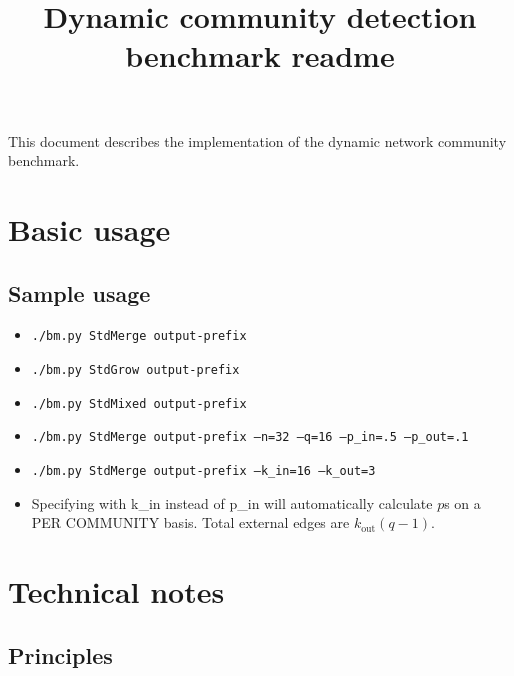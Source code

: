 \documentclass{article}
\title{Dynamic community detection benchmark readme}
\def\out{\mathrm{out}}
\begin{document}
\maketitle

This document describes the implementation of the dynamic network
community benchmark.


\section{Basic usage}

\subsection{Sample usage}

\begin{itemize}
\item \texttt{./bm.py StdMerge output-prefix}
\item \texttt{./bm.py StdGrow output-prefix}
\item \texttt{./bm.py StdMixed output-prefix}
\item \texttt{./bm.py StdMerge output-prefix --n=32 --q=16 --p\_in=.5 --p\_out=.1}
\item \texttt{./bm.py StdMerge output-prefix --k\_in=16 --k\_out=3}
\item Specifying with k\_in instead of p\_in will automatically
  calculate $p$s on a PER COMMUNITY basis.  Total external edges are $k_\out(q-1)$.
\end{itemize}


\section{Technical notes}

\subsection{Principles}
\label{sec:principles}
\end{document}

